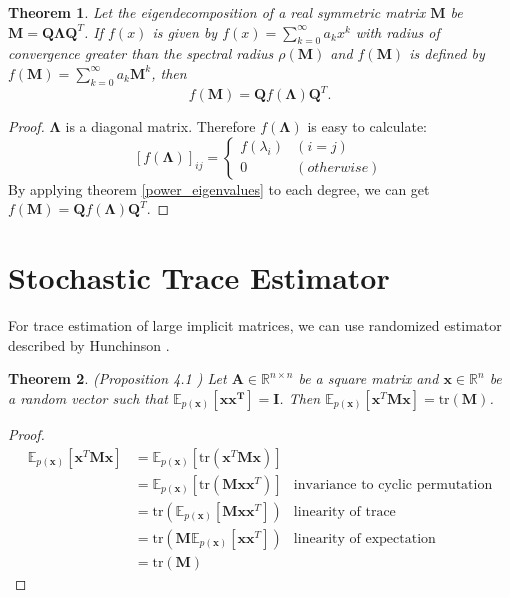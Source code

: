 \documentclass[senior,final,11pt]{iscs-thesis}
\newtheorem{theorem}{Theorem}
\begin{document}
\begin{theorem}
    Let the eigendecomposition of a real symmetric matrix $\mathbf{M}$ be $\mathbf{M}=\mathbf{Q}\mathbf{\Lambda}\mathbf{Q}^T$. If $f(x)$ is given by $f(x)=\sum_{k=0}^{\infty} a_k x^k$ with radius of convergence greater than the spectral radius $\rho(\mathbf{M})$ and $f(\mathbf{M})$ is defined by $f(\mathbf{M})=\sum_{k=0}^{\infty} a_k \mathbf{M}^k$, then
    \[f(\mathbf{M}) = \mathbf{Q}f(\mathbf{\Lambda})\mathbf{Q}^T.\]
\end{theorem}
\begin{proof}
    $\mathbf{\Lambda}$ is a diagonal matrix. Therefore $f(\mathbf{\Lambda})$ is easy to calculate:
    \[
    [f(\mathbf{\Lambda})]_{ij} = \begin{cases}
        f(\lambda_i) & (i=j) \\
        0 & (otherwise)
        \end{cases}
    \]
    By applying theorem \ref{power_eigenvalues} to each degree, we can get $f(\mathbf{M}) = \mathbf{Q}f(\mathbf{\Lambda})\mathbf{Q}^T$.
\end{proof}


\section{Stochastic Trace Estimator} \label{STE}
For trace estimation of large implicit matrices, we can use randomized estimator described by Hunchinson \cite{hutchinson1989stochastic, adams2018estimating}.
\begin{theorem}
    \label{Hunchinson}
    (Proposition 4.1 \cite{adams2018estimating}) Let ${\mathbf A} \in \mathbb{R}^{n\times n}$ be a square matrix and $\mathbf{x} \in \mathbb{R}^n$ be a random vector such that $\mathbb{E}_{p(\mathbf{x})}[\mathbf{xx^T}] = \mathbf{I}$. Then $\mathbb{E}_{p(\mathbf{x})}[\mathbf{x}^{T}\mathbf{M}\mathbf{x}] = \mathrm{tr}(\mathbf{M})$.
\end{theorem}

\begin{proof}
    \begin{align*}
        \mathbb{E}_{p(\mathbf{x})}[\mathbf{x}^{T}\mathbf{M}\mathbf{x}] &= \mathbb{E}_{p(\mathbf{x})}[\mathrm{tr}(\mathbf{x}^{T}\mathbf{M}\mathbf{x})] \\
          &=  \mathbb{E}_{p(\mathbf{x})}[\mathrm{tr}(\mathbf{M}\mathbf{x}\mathbf{x}^{T})]  &\text{invariance to cyclic permutation} \\
          &= \mathrm{tr}(\mathbb{E}_{p(\mathbf{x})}[\mathbf{M}\mathbf{x}\mathbf{x}^{T}] ) &\text{linearity of trace}  \\
          &= \mathrm{tr}(\mathbf{M}\mathbb{E}_{p(\mathbf{x})}[\mathbf{x}\mathbf{x}^{T}] ) &\text{linearity of expectation}  \\
          &= \mathrm{tr}(\mathbf{M})
    \end{align*}
\end{proof}
\end{document}
